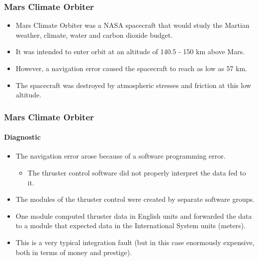 \begin{frame}[hasprev=false, hasnext=true]
\label{example:mars-climate-orbiter}
\frametitle{Mars Climate Orbiter}

\begin{itemize}
	\item Mars Climate Orbiter was a NASA spacecraft that would study the
	Martian weather, climate, water and carbon dioxide budget.

	\item It was intended to enter orbit at an altitude of 140.5 - 150 km
	above Mars.

	\item However, a navigation error caused the spacecraft to reach as low as
	57 km.

	\item The spacecraft was destroyed by atmospheric stresses and friction at
	this low altitude.
\end{itemize}
\end{frame}


\begin{frame}[hasprev=true, hasnext=false]
\frametitle{Mars Climate Orbiter}
\framesubtitle{Diagnostic}

\begin{itemize}
	\item The navigation error arose because of a software programming error.
	\begin{itemize}
		\item The thruster control software did not properly interpret the data
		fed to it.
	\end{itemize}

	\item The modules of the thruster control were created by separate software
	groups.

	\item One module computed thruster data in English units and forwarded the
	data to a module that expected data in the International System units
	(meters).

	\item This is a very typical integration fault (but in this case enormously
	expensive, both in terms of money and prestige).
\end{itemize}
\end{frame}